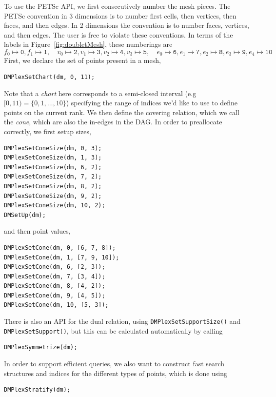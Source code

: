 To use the PETSc API, we first consecutively number the mesh pieces. The PETSc convention in 3 dimensions is to number first cells,
then vertices, then faces, and then edges. In 2 dimensions the convention is to number faces, vertices, and then edges. The user is free to violate these conventions. In terms of the labels in Figure~\ref{fig:doubletMesh}, these numberings are
\begin{equation*}
  f_0 \mapsto \mathtt{0}, f_1 \mapsto \mathtt{1}, \quad v_0 \mapsto \mathtt{2}, v_1 \mapsto \mathtt{3}, v_2 \mapsto \mathtt{4}, v_3 \mapsto \mathtt{5}, \quad e_0 \mapsto \mathtt{6}, e_1 \mapsto \mathtt{7}, e_2 \mapsto \mathtt{8}, e_3 \mapsto \mathtt{9}, e_4 \mapsto \mathtt{10}
\end{equation*}
First, we declare the set of points present in a mesh,
\begin{lstlisting}
DMPlexSetChart(dm, 0, 11);
\end{lstlisting}
Note that a \emph{chart} here corresponds to a semi-closed interval (e.g $[0,11) = \{0,1,\ldots,10\}$) specifying the range of indices we'd like to use to define points on the current rank.
We then define the covering relation, which we call the \textit{cone}, which are also the in-edges in the DAG. In order
to preallocate correctly, we first setup sizes,
\begin{lstlisting}
DMPlexSetConeSize(dm, 0, 3);
DMPlexSetConeSize(dm, 1, 3);
DMPlexSetConeSize(dm, 6, 2);
DMPlexSetConeSize(dm, 7, 2);
DMPlexSetConeSize(dm, 8, 2);
DMPlexSetConeSize(dm, 9, 2);
DMPlexSetConeSize(dm, 10, 2);
DMSetUp(dm);
\end{lstlisting}
and then point values,
\begin{lstlisting}
DMPlexSetCone(dm, 0, [6, 7, 8]);
DMPlexSetCone(dm, 1, [7, 9, 10]);
DMPlexSetCone(dm, 6, [2, 3]);
DMPlexSetCone(dm, 7, [3, 4]);
DMPlexSetCone(dm, 8, [4, 2]);
DMPlexSetCone(dm, 9, [4, 5]);
DMPlexSetCone(dm, 10, [5, 3]);
\end{lstlisting}

There is also an API for the dual relation, using \lstinline{DMPlexSetSupportSize()} and \break\lstinline{DMPlexSetSupport()}, but this can be
calculated automatically by calling
\begin{lstlisting}
DMPlexSymmetrize(dm);
\end{lstlisting}
In order to support efficient queries, we also want to construct fast search structures and indices for the different
types of points, which is done using
\begin{lstlisting}
DMPlexStratify(dm);
\end{lstlisting}

